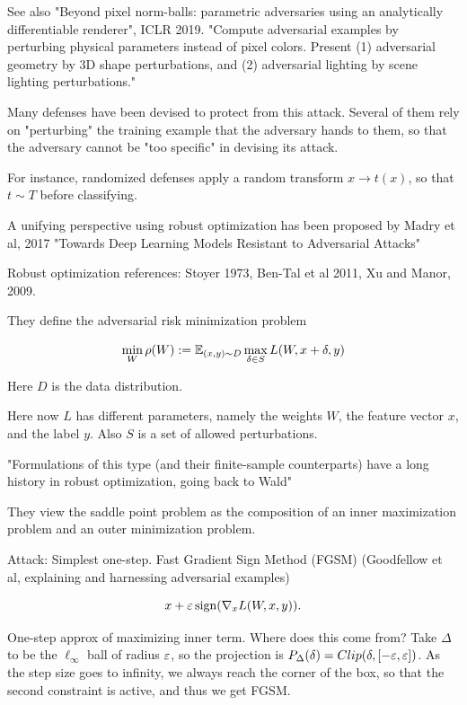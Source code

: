 \documentclass[english]{article}
\begin{document}
See also "Beyond pixel norm-balls: parametric adversaries using an analytically differentiable renderer", ICLR 2019. "Compute adversarial examples by perturbing physical parameters instead of pixel colors. Present (1) adversarial geometry by 3D shape perturbations, and (2) adversarial lighting by scene lighting perturbations."

\item Many defenses have been devised to protect from this attack. Several of them rely on "perturbing" the training example that the adversary hands to them, so that the adversary cannot be "too specific" in devising its attack. 

For instance, randomized defenses apply a random transform $x\to t(x)$, so that $t\sim T$ before classifying.

\item A unifying perspective using robust optimization has been proposed by Madry et al, 2017 "Towards Deep Learning Models Resistant to Adversarial Attacks"

Robust optimization references: Stoyer 1973, Ben-Tal et al 2011, Xu and Manor, 2009. 

They define the adversarial risk minimization problem

$$
\min_W \rho(W):=\mathbb{E}_{(x,y)\sim D} \max_{\delta\in S} L(W,x+\delta,y)
$$

Here $D$ is the data distribution.

Here now $L$ has different parameters, namely the weights $W$, the feature vector $x$, and the label $y$. Also $S$ is a set of allowed perturbations. 

"Formulations of this type (and their finite-sample counterparts) have a long history in robust optimization, going back to Wald"

They view the saddle point problem as the composition of an inner maximization problem and an outer minimization problem.

\benum 
\item  Attack: Simplest one-step. Fast Gradient Sign Method (FGSM) (Goodfellow et al, explaining and harnessing adversarial examples)

$$x + \varepsilon \operatorname{sign}(\nabla_x L(W,x,y)).$$

One-step approx of maximizing inner term. Where does this come from? Take $\Delta$ to be the $\ell_\infty$ ball of radius $\varepsilon$, so the projection is $P_\Delta(\delta) = Clip(\delta,[-\varepsilon,\varepsilon])$. As the step size goes to infinity, we always reach the corner of the box, so that the second constraint is active, and thus we get FGSM.
\end{document}
